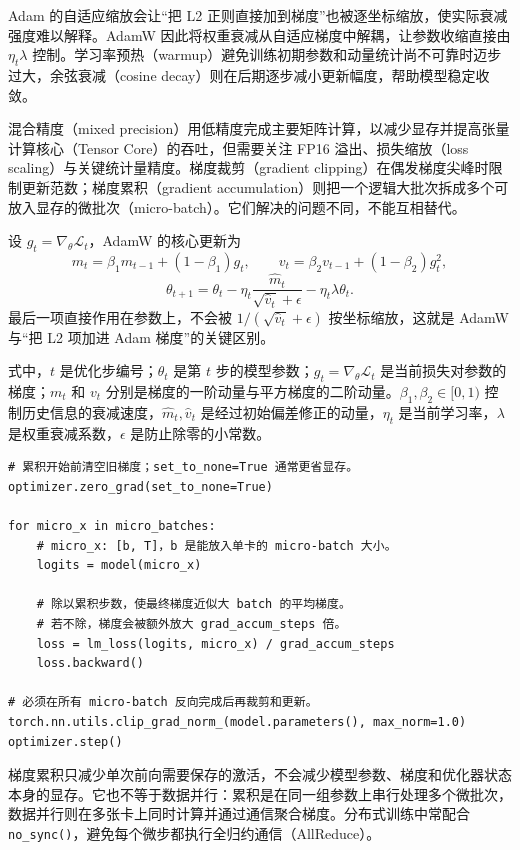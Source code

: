 Adam 的自适应缩放会让“把 L2 正则直接加到梯度”也被逐坐标缩放，使实际衰减强度难以解释。AdamW 因此将权重衰减从自适应梯度中解耦，让参数收缩直接由 $\eta_t\lambda$ 控制。学习率预热（warmup）避免训练初期参数和动量统计尚不可靠时迈步过大，余弦衰减（cosine decay）则在后期逐步减小更新幅度，帮助模型稳定收敛。

混合精度（mixed precision）用低精度完成主要矩阵计算，以减少显存并提高张量计算核心（Tensor Core）的吞吐，但需要关注 FP16 溢出、损失缩放（loss scaling）与关键统计量精度。梯度裁剪（gradient clipping）在偶发梯度尖峰时限制更新范数；梯度累积（gradient accumulation）则把一个逻辑大批次拆成多个可放入显存的微批次（micro-batch）。它们解决的问题不同，不能互相替代。

设 $g_t=\nabla_\theta\mathcal L_t$，AdamW 的核心更新为
\[
m_t=\beta_1m_{t-1}+(1-\beta_1)g_t,\qquad
v_t=\beta_2v_{t-1}+(1-\beta_2)g_t^2,
\]
\[
\theta_{t+1}
=\theta_t-\eta_t\frac{\hat m_t}{\sqrt{\hat v_t}+\epsilon}
-\eta_t\lambda\theta_t.
\]
最后一项直接作用在参数上，不会被 $1/(\sqrt{\hat v_t}+\epsilon)$ 按坐标缩放，这就是 AdamW 与“把 L2 项加进 Adam 梯度”的关键区别。

式中，$t$ 是优化步编号；$\theta_t$ 是第 $t$ 步的模型参数；$g_t=\nabla_\theta\mathcal L_t$ 是当前损失对参数的梯度；$m_t$ 和 $v_t$ 分别是梯度的一阶动量与平方梯度的二阶动量。$\beta_1,\beta_2\in[0,1)$ 控制历史信息的衰减速度，$\hat m_t,\hat v_t$ 是经过初始偏差修正的动量，$\eta_t$ 是当前学习率，$\lambda$ 是权重衰减系数，$\epsilon$ 是防止除零的小常数。

\begin{lstlisting}
# 累积开始前清空旧梯度；set_to_none=True 通常更省显存。
optimizer.zero_grad(set_to_none=True)

for micro_x in micro_batches:
    # micro_x: [b, T]，b 是能放入单卡的 micro-batch 大小。
    logits = model(micro_x)

    # 除以累积步数，使最终梯度近似大 batch 的平均梯度。
    # 若不除，梯度会被额外放大 grad_accum_steps 倍。
    loss = lm_loss(logits, micro_x) / grad_accum_steps
    loss.backward()

# 必须在所有 micro-batch 反向完成后再裁剪和更新。
torch.nn.utils.clip_grad_norm_(model.parameters(), max_norm=1.0)
optimizer.step()
\end{lstlisting}

梯度累积只减少单次前向需要保存的激活，不会减少模型参数、梯度和优化器状态本身的显存。它也不等于数据并行：累积是在同一组参数上串行处理多个微批次，数据并行则在多张卡上同时计算并通过通信聚合梯度。分布式训练中常配合 \texttt{no\_sync()}，避免每个微步都执行全归约通信（AllReduce）。

